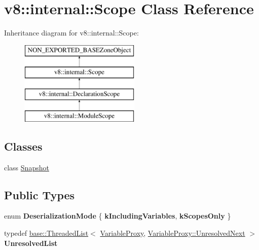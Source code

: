 \hypertarget{classv8_1_1internal_1_1Scope}{}\section{v8\+:\+:internal\+:\+:Scope Class Reference}
\label{classv8_1_1internal_1_1Scope}
Inheritance diagram for v8\+:\+:internal\+:\+:Scope\+:\begin{figure}[H]
\begin{center}
\leavevmode
\includegraphics[height=4.000000cm]{classv8_1_1internal_1_1Scope}
\end{center}
\end{figure}
\subsection*{Classes}
\begin{DoxyCompactItemize}
\item 
class \mbox{\hyperlink{classv8_1_1internal_1_1Scope_1_1Snapshot}{Snapshot}}
\end{DoxyCompactItemize}
\subsection*{Public Types}
\begin{DoxyCompactItemize}
\item 
\mbox{\label{classv8_1_1internal_1_1Scope_a6d2d10c1cb301504edb67fc07389c5d1}} 
enum {\bfseries Deserialization\+Mode} \{ {\bfseries k\+Including\+Variables}, 
{\bfseries k\+Scopes\+Only}
 \}
\item 
\mbox{\label{classv8_1_1internal_1_1Scope_a10d1a89af5d31fc4db9b1cd0bfd6ea3c}} 
typedef \mbox{\hyperlink{classv8_1_1base_1_1ThreadedListBase}{base\+::\+Threaded\+List}}$<$ \mbox{\hyperlink{classv8_1_1internal_1_1VariableProxy}{Variable\+Proxy}}, \mbox{\hyperlink{structv8_1_1internal_1_1VariableProxy_1_1UnresolvedNext}{Variable\+Proxy\+::\+Unresolved\+Next}} $>$ {\bfseries Unresolved\+List}
\end{DoxyCompactItemize}
